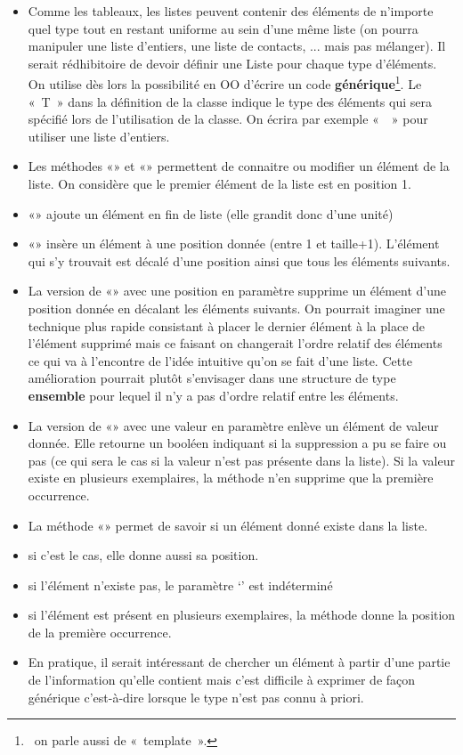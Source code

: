 \liststyleListv
\begin{itemize}
\item {
Comme les tableaux, les listes peuvent contenir des éléments de
n’importe quel type tout en restant uniforme au sein d’une même liste
(on pourra manipuler une liste d’entiers, une liste de contacts, ...
mais pas mélanger). Il serait rédhibitoire de devoir définir une Liste
pour chaque type d’éléments. On utilise dès lors la possibilité en OO
d’écrire un code \textbf{générique}\footnote{\ on parle aussi de
«~template~».}. Le «~T~» dans la définition de la classe indique le
type des éléments qui sera spécifié lors de l’utilisation de la classe.
On écrira par exemple «~~» pour
utiliser une liste d’entiers.}
\item {
Les méthodes «» et «»
permettent de connaitre ou modifier un élément de la liste. On
considère que le premier élément de la liste est en position 1.}
\item {
«» ajoute un élément en fin de liste (elle
grandit donc d’une unité)}
\item {
«» insère un élément à une position donnée
(entre 1 et taille+1). L’élément qui s’y trouvait est décalé
d'une position ainsi que tous les éléments suivants.}
\item {
La version de «» avec une position en
paramètre supprime un élément d'une position donnée en
décalant les éléments suivants. On pourrait imaginer une technique plus
rapide consistant à placer le dernier élément à la place de l’élément
supprimé mais ce faisant on changerait l’ordre relatif des éléments ce
qui va à l’encontre de l’idée intuitive qu’on se fait d’une liste.
Cette amélioration pourrait plutôt s’envisager dans une structure de
type \textbf{ensemble} pour lequel il n’y a pas d’ordre relatif entre
les éléments.}
\item {
La version de «» avec une valeur en
paramètre enlève un élément de valeur donnée. Elle retourne un booléen
indiquant si la suppression a pu se faire ou pas (ce qui sera le cas si
la valeur n’est pas présente dans la liste). Si la valeur existe en
plusieurs exemplaires, la méthode n’en supprime que la première
occurrence.}
\item {
La méthode «» permet de savoir si un élément
donné existe dans la liste. }
\item {
si c’est le cas, elle donne aussi sa position.}
\item {
si l’élément n’existe pas, le paramètre ‘’ est
indéterminé }
\item {
si l’élément est présent en plusieurs exemplaires, la méthode donne la
position de la première occurrence.}
\item {
En pratique, il serait intéressant de chercher un élément à partir d’une
partie de l’information qu’elle contient mais c’est difficile à
exprimer de façon générique c'est-à-dire lorsque le
type n'est pas connu à priori.}
\end{itemize}

